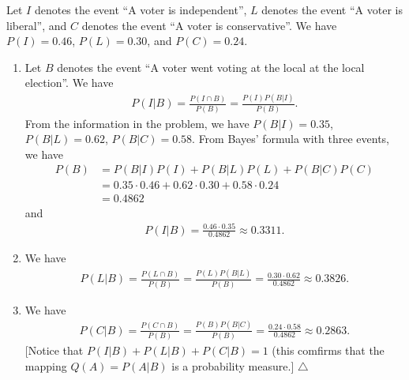 	\begin{problem}
	Let $I$ denotes the event ``A voter is independent'', $L$ denotes the event ``A voter is liberal'', and $C$ denotes the event ``A voter is conservative''. We have $P (I) = 0.46$, $P (L ) = 0.30$, and $P (C) = 0.24$.
	\begin{enumerate}[label=\alph*)]
	\item Let $B$ denotes the event ``A voter went voting at the local at the local election''. We have
		\begin{align*}
		P (I | B) = \frac{P (I \cap B)}{P (B)} = \frac{P (I) P (B | I)}{P (B)} .
		\end{align*}
	From the information in the problem, we have $P (B | I ) = 0.35$, $P (B|L) = 0.62$, $P (B|C) = 0.58$. From Bayes' formula with three events, we have
		\begin{align*}
		P (B) &= P (B | I ) P (I) + P (B | L )P (L) + P (B | C) P (C) \\
		&= 0.35 \cdot 0.46 + 0.62 \cdot 0.30 + 0.58 \cdot 0.24 \\
		&= 	0.4862 
		\end{align*}
	and
		\begin{align*}
		P (I | B) = \frac{0.46 \cdot 0.35}{0.4862} \approx 0.3311 .
		\end{align*}
	\item We have
		\begin{align*}
		P (L | B) = \frac{P (L \cap B)}{P (B)} = \frac{P (L) P (B | L)}{P (B)} = \frac{0.30 \cdot 0.62}{0.4862} \approx 0.3826 .
		\end{align*}
	\item We have
		\begin{align*}
		P (C | B) = \frac{P (C \cap B)}{P (B)} = \frac{P (B) P (B|C)}{P (B)} = \frac{0.24 \cdot 0.58}{0.4862} \approx 0.2863 .
		\end{align*}
	[Notice that $P (I |B) + P (L | B) + P (C | B) = 1$ (this comfirms that the mapping $Q (A) = P (A | B)$ is a probability measure.] \hfill $\triangle$
	\end{enumerate}
	\end{problem}
	
